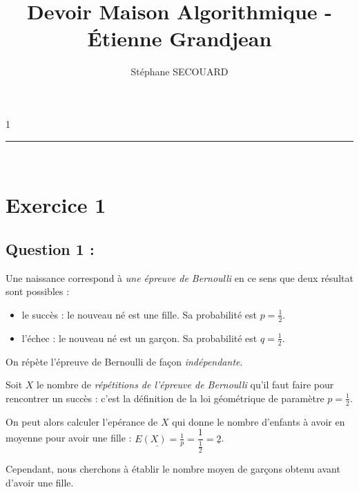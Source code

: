 1\documentclass[a4paper, 11pt,french]{article}
\title{\Large{Devoir Maison Algorithmique - Étienne Grandjean}}
\author{\large{Stéphane SECOUARD}}
\begin{document}
\vfill
 

\maketitle %

\vfill


\begin{center}
    \rule{7cm}{0.5pt}
\end{center}

\

\vfill

\tableofcontents

\vfill
\vfill
\vfill




\section*{Exercice 1}

\subsection*{Question 1 :}

Une naissance correspond à \emph{une épreuve de Bernoulli} en ce sens que deux résultat sont possibles :
\begin{itemize}
\item le succès : le nouveau né est une fille. Sa probabilité est $p=\frac{1}{2}$.
\item l'échec : le nouveau né est un garçon. Sa probabilité est $q=\frac{1}{2}$.
\end{itemize}

On répète l'épreuve de Bernoulli de façon \emph{indépendante}.

\medskip

Soit $X$ le nombre de \emph{répétitions de l'épreuve de Bernoulli} qu'il faut faire pour rencontrer un succès : c'est la définition de la loi géométrique de paramètre $p=\frac{1}{2}$.

\bigskip

On peut alors calculer l'epérance de $X$ qui donne le nombre d'enfants à avoir en moyenne pour avoir une fille : $\underline{E(X)=}\frac{1}{p}=\dfrac{1}{\frac{1}{2}}=\underline{2}$.

Cependant, nous cherchons à établir le nombre moyen de garçons obtenu avant d'avoir une fille.
\end{document}
